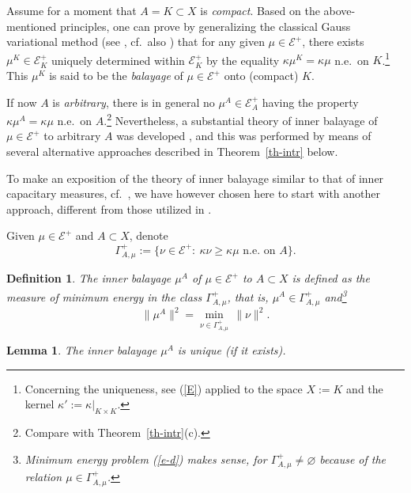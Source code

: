 \documentclass[12pt,a4paper,reqno]{amsart} %
\theoremstyle{lause}
\theoremstyle{maaritelma}
\theoremstyle{lause}
\newtheorem{lemma}[theorem]{Lemma}
\theoremstyle{maaritelma}
\newtheorem{definition}[theorem]{Definition}
\numberwithin{equation}{section}
\begin{document}
Assume for a moment that $A=K\subset X$ is {\it compact}. Based on the abo\-ve-men\-tio\-ned principles, one can prove by generalizing the classical Gauss variational method (see \cite{C0,Ca2}, cf.\ also \cite[Section~IV.5.23]{L}) that for any given $\mu\in\mathcal E^+$, there exists $\mu^K\in\mathcal E^+_K$ uniquely determined within $\mathcal E^+_K$ by the equality $\kappa\mu^K=\kappa\mu$ n.e.\ on $K$.\footnote{Concerning the uniqueness, see (\ref{E}) applied to the space $X:=K$ and the kernel $\kappa':=\kappa|_{K\times K}$.}
This $\mu^K$ is said to be the {\it balayage\/}  of $\mu\in\mathcal E^+$ onto (compact) $K$.

If now $A$ is {\it arbitrary}, there is in general no $\mu^A\in\mathcal E^+_A$ having  the property
$\kappa\mu^A=\kappa\mu$ n.e.\ on $A$.\footnote{Compare with Theorem~\ref{th-intr}(c).} Nevertheless, a substantial theory of inner balayage of $\mu\in\mathcal E^+$ to arbitrary $A$ was developed \cite{Z-arx1}, and this was performed by means of several alternative approaches described in Theorem~\ref{th-intr} below.

 To make an exposition of the theory of inner balayage similar to that of inner capacitary measures, cf.\ \cite[Section~4.1]{F1}, we have however chosen here to start with another approach, different from those utilized in \cite{Z-arx1}.

Given $\mu\in\mathcal E^+$ and $A\subset X$, denote
\begin{equation}\label{io-n}\Gamma_{A,\mu}^+:=\bigl\{\nu\in\mathcal E^+: \ \kappa\nu\geqslant\kappa\mu\text{ \ n.e.\ on $A$}\bigr\}.\end{equation}

\begin{definition}\label{def-bal-n} The {\it inner balayage\/} $\mu^A$ of $\mu\in\mathcal E^+$ to $A\subset X$ is defined as the measure of minimum energy in the class $\Gamma_{A,\mu}^+$, that is,  $\mu^A\in\Gamma_{A,\mu}^+$ and\footnote{Minimum energy problem (\ref{e-d}) makes sense, for $\Gamma_{A,\mu}^+\ne\varnothing$ because of the relation $\mu\in\Gamma_{A,\mu}^+$.}
\begin{equation}\label{e-d}\|\mu^A\|^2=\min_{\nu\in\Gamma_{A,\mu}^+}\,\|\nu\|^2.\end{equation}
\end{definition}

\begin{lemma}\label{def-bal-n-u}
  The inner balayage\/ $\mu^A$ is unique\/ {\rm(}if it exists\/{\rm)}.
\end{lemma}
\end{document}
